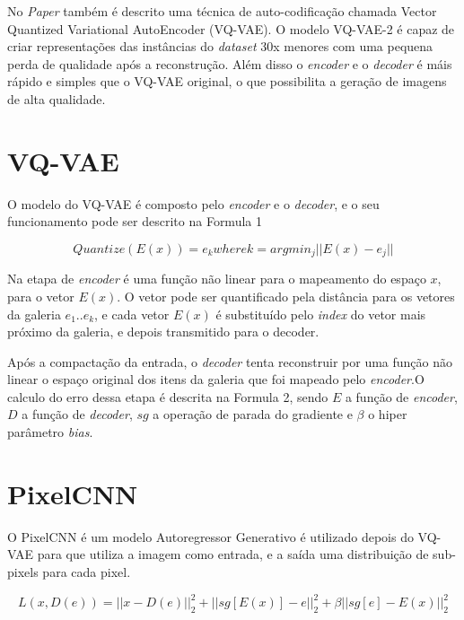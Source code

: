 \documentclass[12pt]{article}
\begin{document}
No \textit{Paper} também é descrito uma técnica de auto-codificação chamada Vector Quantized Variational AutoEncoder (VQ-VAE). O modelo VQ-VAE-2 é capaz de criar representações das instâncias do \textit{dataset} 30x menores com uma pequena perda de qualidade após a reconstrução. Além disso o \textit{encoder} e o \textit{decoder} é máis rápido e simples que o VQ-VAE original, o que possibilita a geração de imagens de alta qualidade.


\section{VQ-VAE}

O modelo do VQ-VAE é composto pelo \textit{encoder} e o \textit{decoder}, e o seu funcionamento pode ser descrito na Formula 1 

\begin{equation}
     Quantize(E(x)) = e_{k} where k = arg min_{j} || E(x) - e_{j}||
     \label{eq:saida-neuronio}
\end{equation}

Na etapa de \textit{encoder} é uma função não linear para o mapeamento do espaço $x$, para o vetor $E(x)$. O vetor pode ser quantificado pela distância para os vetores da galeria $e_{1}..e_{k}$, e cada vetor $E(x)$ é substituído pelo \textit{index} do vetor mais próximo da galeria, e depois transmitido para o decoder. 

Após a compactação da entrada, o \textit{decoder} tenta reconstruir por uma função não linear o espaço original dos itens da galeria que foi mapeado pelo \textit{encoder}.O calculo do erro dessa etapa é descrita na Formula 2, sendo $E$ a função de \textit{encoder}, $D$ a função de \textit{decoder}, $sg$ a operação de parada do gradiente e $\beta$ o hiper parâmetro 
\textit{bias}.

\section{PixelCNN}

O PixelCNN é um modelo Autoregressor Generativo é utilizado depois do VQ-VAE para   que utiliza a imagem como entrada, e a saída uma distribuição de sub-pixels para cada pixel.

\begin{equation}
     L(x,D(e)) = ||x - D(e)||_{2}^{2} + ||sg[E(x)] - e||_{2}^{2} + \beta||sg[e] - E(x)||_{2}^{2} 
     \label{eq:saida-neuronio}
\end{equation}
\end{document}
